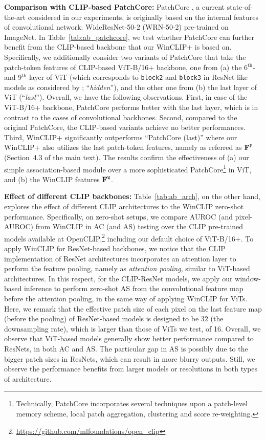 \noindent\textbf{Comparison with CLIP-based PatchCore: } 
PatchCore \cite{roth2022towards}, a current state-of-the-art considered in our experiments, is originally based on the internal features of convolutional network: \eg WideResNet-50-2 (WRN-50-2)  \cite{zagoruyko2016wideresnet} pre-trained on ImageNet.   
In Table~\ref{tab:ab_patchcore}, we test whether PatchCore can further benefit from the CLIP-based backbone that our WinCLIP+ is based on. Specifically, we additionally consider two variants of PatchCore that take the patch-token features of CLIP-based ViT-B/16+ backbone, one from (a) the 6$^\text{th}$- and 9$^\text{th}$-layer of ViT (which corresponds to \texttt{block2} and \texttt{block3} in ResNet-like models as considered by \cite{roth2022towards}; ``\emph{hidden}''), and the other one from (b) the last layer of ViT (``\emph{last}''). Overall, we have the following observations. First, in case of the ViT-B/16+ backbone, PatchCore performs better with the last layer, which is in contrast to the cases of convolutional backbones. Second, compared to the original PatchCore, the CLIP-based variants achieve no better performances. Third, WinCLIP+ significantly outperforms ``PatchCore (last)'' where our WinCLIP+ also utilizes the last patch-token features, namely as referred as $\mathbf{F}^{\tt P}$ (Section~4.3 of the main text). The results confirm the effectiveness of (a) our simple association-based module over a more sophisticated PatchCore\footnote{Technically, PatchCore incorporates several techniques upon a patch-level memory scheme, \eg local patch aggregation, clustering and score re-weighting.} in ViT, and (b) the WinCLIP features $\mathbf{F}^{\tt W}$.


\vspace{0.05in}
\noindent\textbf{Effect of different CLIP backbones: }
Table~\ref{tab:ab_arch}, on the other hand, explores the effect of different CLIP architectures to the WinCLIP zero-shot performance. Specifically, on zero-shot setups, we compare AUROC (and pixel-AUROC) from WinCLIP in AC (and AS) testing over the CLIP pre-trained models available at OpenCLIP,\footnote{\url{https://github.com/mlfoundations/open_clip}} including our default choice of ViT-B/16+. To apply WinCLIP for ResNet-based backbones, we notice that the CLIP implementation of ResNet architectures incorporates an attention layer to perform the feature pooling, namely as \emph{attention pooling}, similar to ViT-based architectures. In this respect, for the CLIP-ResNet models, we apply our window-based inference to perform zero-shot AS from the convolutional feature map before the attention pooling, in the same way of applying WinCLIP for ViTs. Here, we remark that the effective patch size of each pixel on the last feature map (before the pooling) of ResNet-based models is designed to be $32$ (the downsampling rate), which is larger than those of ViTs we test, \eg of 16. Overall, we observe that ViT-based models generally show better performance compared to ResNets, in both AC and AS. The particular gap in AS is possibly due to the bigger patch sizes in ResNets, which can result in more blurry outputs. Still, we observe the performance benefits from larger models or resolutions in both types of architecture.

